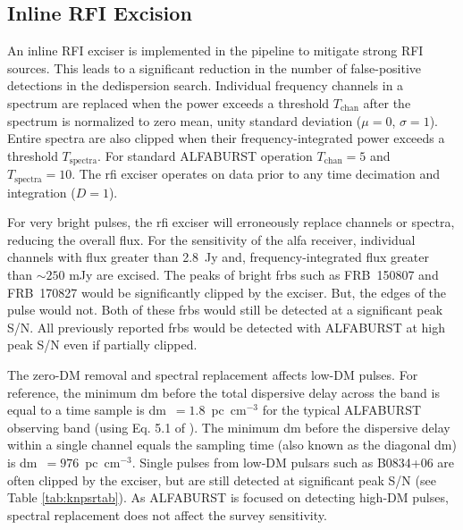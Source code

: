 \documentclass[a4paper,fleqn,usenatbib]{mnras}
\begin{document}

\subsection{Inline RFI Excision}
\label{sec:rfi_excise}

An inline RFI exciser is implemented in the pipeline to mitigate strong RFI
sources. This leads to a significant reduction in the number of false-positive
detections in the dedispersion search.  Individual frequency channels in a
spectrum are replaced when the power exceeds a threshold $T_{\textrm{chan}}$
after the spectrum is normalized to zero mean, unity standard deviation
($\mu=0$, $\sigma=1$). Entire spectra are also clipped when their
frequency-integrated power exceeds a threshold $T_{\textrm{spectra}}$. For
standard ALFABURST operation $T_{\textrm{chan}} = 5$ and $T_{\textrm{spectra}} =
10$.  The \gls{rfi} exciser operates on data prior to any time decimation and 
integration ($D=1$).

For very bright pulses, the \gls{rfi} exciser will erroneously replace channels
or spectra, reducing the overall flux.  For the sensitivity of the \gls{alfa}
receiver, individual channels with flux greater than 2.8~Jy and,
frequency-integrated flux greater than $\sim250$ mJy are excised. The peaks of
bright \glspl{frb} such as FRB~150807 and FRB~170827 would be significantly
clipped by the exciser. But, the edges of the pulse would not. Both of these
\glspl{frb} would still be detected at a significant peak S/N. All previously
reported \glspl{frb} would be detected with ALFABURST at high peak S/N even if
partially clipped.

The zero-DM removal and spectral replacement affects low-DM pulses. For
reference, the minimum \gls{dm} before the total dispersive delay across the
band is equal to a time sample is \gls{dm}~$=1.8$~pc~cm$^{-3}$ for the
typical ALFABURST observing band (using Eq. 5.1 of \cite{2004hpa..book.....L}).
The minimum \gls{dm} before the dispersive delay within a single channel equals
the sampling time (also known as the diagonal \gls{dm}) is 
\gls{dm}~$=976$~pc~cm$^{-3}$. Single pulses from low-DM pulsars such
as B0834+06 are often clipped by the exciser, but are still detected at
significant peak S/N (see Table \ref{tab:knpsrtab}). As ALFABURST is focused on
detecting high-DM pulses, spectral replacement does not affect the survey
sensitivity.

\end{document}
